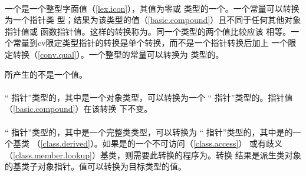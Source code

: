 \paragraph{} %
一个是一个整型字面值（\ref{lex.icon}），其值为零或
类型的一个\prvalue{}。一个\nullp{}常量可以转换为一个指针类
型；结果为该类型的\nullp{}值（\ref{basic.compound}）且不同于任何其他对象指针值或
函数指针值。这样的转换称为。同一个类型的两个\nullp{}值比较应该
相等。一个\nullp{}常量到cv限定类型指针的转换是单个转换，而不是一个指针转换后加上
一个限定转换（\ref{conv.qual}）。一个整型的\nullp{}常量可以转换为
类型的\prvalue{}。

\begin{note}
  所产生的\prvalue{}不是一个\nullp{}值。
\end{note}

\paragraph{} %
“ 指针”类型的\prvalue{}，其中是一个对象类型，可以转换为一个
“ 指针”类型的\prvalue{}。指针值（\ref{basic.compound}）在该转换
下不变。

\paragraph{} %
“ 指针”类型的\prvalue{}，其中是一个完整类类型，可以转换为
“ 指针”类型的\prvalue{}，其中是的一个基类
（\ref{class.derived}）。如果是的一个不可访问（\ref{class.access}）
或有歧义（\ref{class.member.lookup}）基类，则需要此转换的程序为\illform{}。转换
结果是派生类对象的基类子对象指针。\nullp{}值可以转换为目标类型的\nullp{}值。
